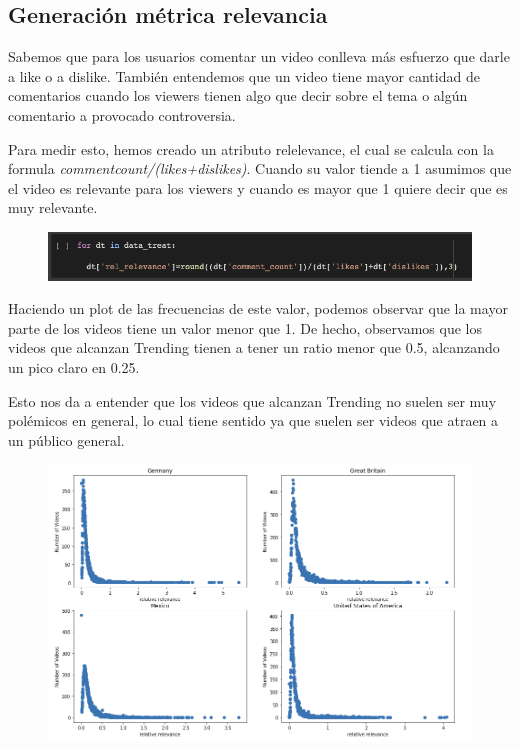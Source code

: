 \documentclass[a4paper,12pt]{article}
\begin{document}
\subsection{Generaci\'on m\'etrica relevancia}
Sabemos que para los usuarios comentar un video conlleva m\'as esfuerzo que darle a like o a dislike. Tambi\'en entendemos que un video tiene mayor cantidad de comentarios cuando los viewers tienen algo que decir sobre el tema o alg\'un comentario a provocado controversia.

Para medir esto, hemos creado un atributo rel{\textunderscore}elevance, el cual se calcula con la formula {\itshape comment{\textunderscore}count/(likes+dislikes)}. Cuando su valor tiende a 1 asumimos que el video es relevante para los viewers y cuando es mayor que 1 quiere decir que es muy relevante.
\begin{figure}[h!]
\centering
\includegraphics[width=13cm]{rel_gen.png}
\end{figure}

Haciendo un plot de las frecuencias de este valor, podemos observar que la mayor parte de los videos tiene un valor menor que  1.  De hecho, observamos que los videos que alcanzan Trending tienen a tener un ratio menor que 0.5, alcanzando un pico claro en 0.25.

Esto nos da a entender que los videos que alcanzan Trending no suelen ser muy pol\'emicos en general, lo cual tiene sentido ya que suelen ser videos que atraen a un p\'ublico general.

\begin{figure}[h!]
\centering
\includegraphics[width=14cm]{rel_relevance_plot.png}
\end{figure}
\end{document}

